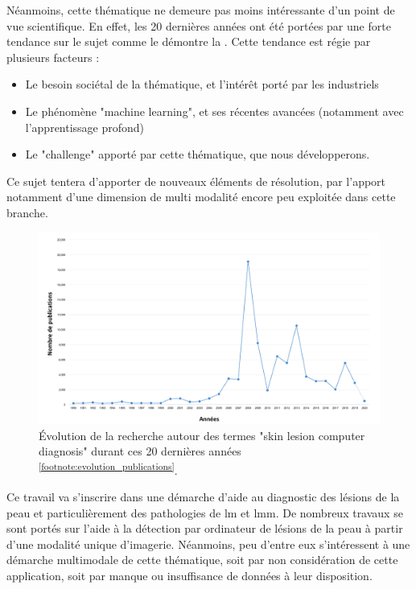 Néanmoins, cette thématique ne demeure pas moins intéressante d’un point de vue scientifique. En effet, les 20 dernières années ont été portées par une forte tendance sur le sujet comme le démontre la . Cette tendance est régie par plusieurs facteurs :
\begin{itemize}
\item Le besoin sociétal de la thématique, et l'intérêt porté par les industriels
\item Le phénomène "machine learning", et ses récentes avancées (notamment avec l'apprentissage profond)
\item Le "challenge" apporté par cette thématique, que nous développerons.
\end{itemize}\par
Ce sujet tentera d’apporter de nouveaux éléments de résolution, par l’apport notamment d’une dimension de multi modalité encore peu exploitée dans cette branche. 
\begin{figure}[H]
    \centering
    \includegraphics[width=\linewidth]{contents/i_introduction/resources/evolution_publications.pdf}
    \caption{Évolution de la recherche autour des termes "skin lesion computer diagnosis" durant ces 20 dernières années \textsuperscript{\ref{footnote:evolution_publications}}.}
    \label{fig:evolution_publications}
\end{figure}\par
\addtocounter{footnote}{1}

Ce travail va s'inscrire dans une démarche d'aide au diagnostic des lésions de la peau et particulièrement des pathologies de \gls{lm} et \gls{lmm}. De nombreux travaux se sont portés sur l'aide à la détection par ordinateur de lésions de la peau à partir d'une modalité unique d'imagerie. Néanmoins, peu d'entre eux s'intéressent à une démarche multimodale de cette thématique, soit par non considération de cette application, soit par manque ou insuffisance de données à leur disposition.\par

